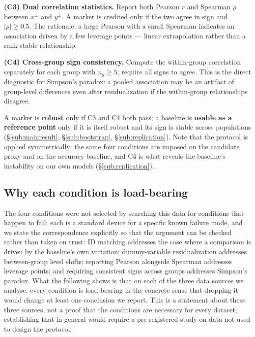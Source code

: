 \documentclass[10pt]{article} %
\newcommand{\srcref}[1]{\S\ref{#1}}
\begin{document}
\textbf{(C3) Dual correlation statistics.} Report both Pearson $r$ and Spearman $\rho$ between $x^\perp$ and $y^\perp$. A marker is credited only if the two agree in sign and $|\rho| \geq 0.5$. The rationale: a large Pearson with a small Spearman indicates an association driven by a few leverage points --- linear extrapolation rather than a rank-stable relationship.

\textbf{(C4) Cross-group sign consistency.} Compute the within-group correlation separately for each group with $n_g \ge 5$; require all signs to agree. This is the direct diagnostic for Simpson's paradox: a pooled association may be an artifact of group-level differences even after residualization if the within-group relationships disagree.

A marker is \textbf{robust} only if C3 and C4 both pass; a baseline is \textbf{usable as a reference point} only if it is itself robust and its sign is stable across populations (\srcref{sub:mainresult}, \srcref{sub:bootstrap}, \srcref{sub:replication}). Note that the protocol is applied symmetrically: the same four conditions are imposed on the candidate proxy and on the accuracy baseline, and C4 is what reveals the baseline's instability on our own models (\srcref{sub:replication}).

\subsection{Why each condition is load-bearing}
\label{sub:loadbearing}

The four conditions were not selected by searching this data for conditions that happen to fail; each is a standard device for a specific known failure mode, and we state the correspondence explicitly so that the argument can be checked rather than taken on trust: ID matching addresses the case where a comparison is driven by the baseline's own variation; dummy-variable residualization addresses between-group level shifts; reporting Pearson alongside Spearman addresses leverage points; and requiring consistent signs across groups addresses Simpson's paradox. What the following shows is that on each of the three data sources we analyse, every condition is load-bearing in the concrete sense that dropping it would change at least one conclusion we report. This is a statement about these three sources, not a proof that the conditions are necessary for every dataset; establishing that in general would require a pre-registered study on data not used to design the protocol.
\end{document}
